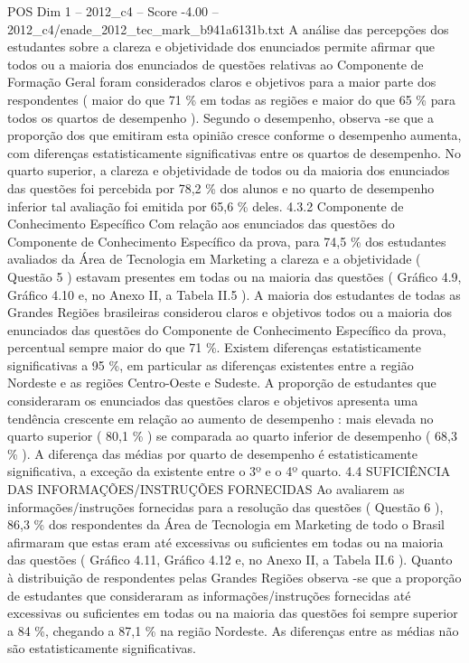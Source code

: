 \begin{textsample}{POS Dim 1 – 2012\_c4 – Score -4.00 – 2012\_c4/enade\_2012\_tec\_mark\_b941a6131b.txt}
A análise das percepções dos estudantes sobre a clareza e objetividade dos enunciados permite afirmar que todos ou a maioria dos enunciados de questões relativas ao Componente de Formação Geral foram considerados claros e objetivos para a maior parte dos respondentes ( maior do que 71 \% em todas as regiões e maior do que 65 \% para todos os quartos de desempenho ).
Segundo o desempenho, observa -se que a proporção dos que emitiram esta opinião cresce conforme o desempenho aumenta, com diferenças estatisticamente significativas entre os quartos de desempenho.
No quarto superior, a clareza e objetividade de todos ou da maioria dos enunciados das questões foi percebida por 78,2 \% dos alunos e no quarto de desempenho inferior tal avaliação foi emitida por 65,6 \% deles. 4.3.2 Componente de Conhecimento Específico Com relação aos enunciados das questões do Componente de Conhecimento Específico da prova, para 74,5 \% dos estudantes avaliados da Área de Tecnologia em Marketing a clareza e a objetividade ( Questão 5 ) estavam presentes em todas ou na maioria das questões ( Gráfico 4.9, Gráfico 4.10 e, no Anexo II, a Tabela II.5 ).
A maioria dos estudantes de todas as Grandes Regiões brasileiras considerou claros e objetivos todos ou a maioria dos enunciados das questões do Componente de Conhecimento Específico da prova, percentual sempre maior do que 71 \%.
Existem diferenças estatisticamente significativas a 95 \%, em particular as diferenças existentes entre a região Nordeste e as regiões Centro-Oeste e Sudeste.
A proporção de estudantes que consideraram os enunciados das questões claros e objetivos apresenta uma tendência crescente em relação ao aumento de desempenho : mais elevada no quarto superior ( 80,1 \% ) se comparada ao quarto inferior de desempenho ( 68,3 \% ).
A diferença das médias por quarto de desempenho é estatisticamente significativa, a exceção da existente entre o 3º e o 4º quarto. 4.4 SUFICIÊNCIA DAS INFORMAÇÕES/INSTRUÇÕES FORNECIDAS Ao avaliarem as informações/instruções fornecidas para a resolução das questões ( Questão 6 ), 86,3 \% dos respondentes da Área de Tecnologia em Marketing de todo o Brasil afirmaram que estas eram até excessivas ou suficientes em todas ou na maioria das questões ( Gráfico 4.11, Gráfico 4.12 e, no Anexo II, a Tabela II.6 ).
Quanto à distribuição de respondentes pelas Grandes Regiões observa -se que a proporção de estudantes que consideraram as informações/instruções fornecidas até excessivas ou suficientes em todas ou na maioria das questões foi sempre superior a 84 \%, chegando a 87,1 \% na região Nordeste.
As diferenças entre as médias não são estatisticamente significativas.

\end{textsample}
